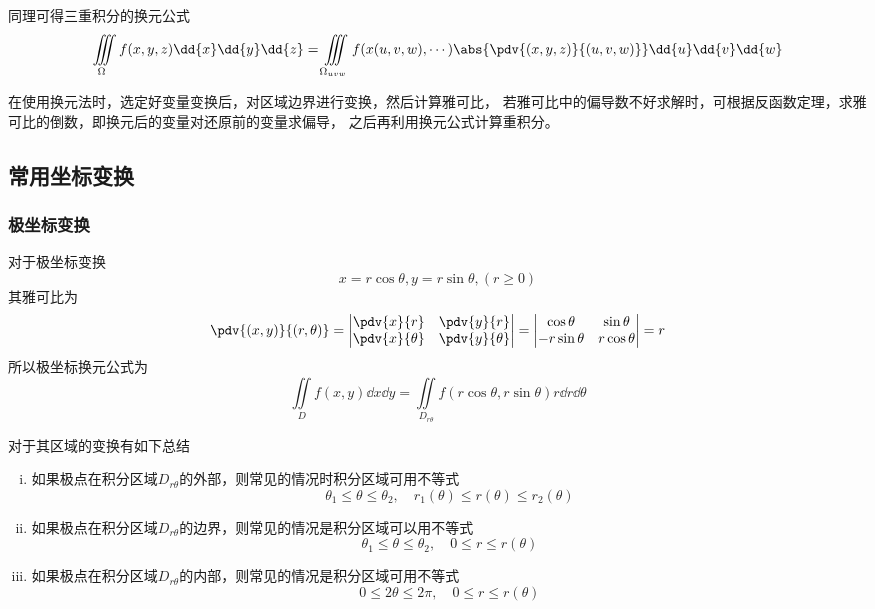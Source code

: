 同理可得三重积分的换元公式
\begin{equation}
    \iiint\limits_\Omega f(x,y,z)\dd{x}\dd{y}\dd{z} = \iiint\limits_{\Omega_{uvw}} f(x(u,v,w),\cdots)\abs{\pdv{(x,y,z)}{(u,v,w)}}\dd{u}\dd{v}\dd{w}
\end{equation}

在使用换元法时，选定好变量变换后，对区域边界进行变换，然后计算雅可比，
若雅可比中的偏导数不好求解时，可根据反函数定理，求雅可比的倒数，即换元后的变量对还原前的变量求偏导，
之后再利用换元公式计算重积分。



\subsection{常用坐标变换}
\subsubsection{极坐标变换}
对于极坐标变换
\[ x = r\cos\theta, y = r\sin\theta, (r \geq 0) \]
其雅可比为
\[
    \pdv{(x,y)}{(r,\theta)} =
    \begin{vmatrix}
        \pdv{x}{r}      & \pdv{y}{r}      \\
        \pdv{x}{\theta} & \pdv{y}{\theta}
    \end{vmatrix}
    =
    \begin{vmatrix}
        \cos\theta   & \sin\theta  \\
        -r\sin\theta & r\cos\theta
    \end{vmatrix}
    =
    r
\]
所以极坐标换元公式为
\begin{equation}
    \iint\limits_D f(x,y)\dd{x}\dd{y} = \iint\limits_{D_{r\theta}} f(r\cos\theta, r\sin\theta) r\dd{r}\dd{\theta}
\end{equation}

对于其区域的变换有如下总结
\begin{enumerate}[(i)]
    \item 如果极点在积分区域$D_{r\theta}$的外部，则常见的情况时积分区域可用不等式
          \[ \theta_1 \leq \theta \leq \theta_2, \quad r_1(\theta) \leq r(\theta) \leq r_2(\theta) \]
    \item 如果极点在积分区域$D_{r\theta}$的边界，则常见的情况是积分区域可以用不等式
          \[ \theta_1 \leq \theta \leq \theta_2,\quad 0 \leq r \leq r(\theta) \]
    \item 如果极点在积分区域$D_{r\theta}$的内部，则常见的情况是积分区域可用不等式
          \[ 0\leq 2\theta \leq 2\pi,\quad 0\leq r\leq r(\theta) \]
\end{enumerate}


